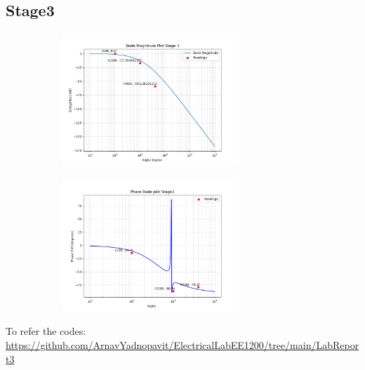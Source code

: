 \documentclass[a4paper,12pt]{article}
\begin{document}
\subsection*{Stage3}
\begin{figure}[H]
    \centering
    \begin{subfigure}{0.5\textwidth}
        \centering
        \includegraphics[height=5cm]{figs/Stage3/Magn.png}
    \end{subfigure}%
    \begin{subfigure}{0.5\textwidth}
        \centering
        \includegraphics[height=5cm]{figs/Stage3/Phase.png}
    \end{subfigure}
\end{figure}
To refer the codes:\\
\url{https://github.com/ArnavYadnopavit/ElectricalLabEE1200/tree/main/LabReport3}
\end{document}
